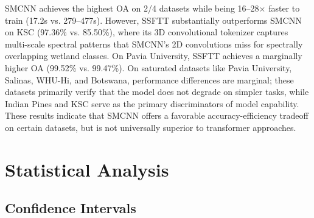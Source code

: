 \documentclass[conference]{IEEEtran}
\begin{document}
{\begin{table}[!t]
\caption{SMCNN vs. Transformer Baselines (OA \%)}
\label{tab:transformer}
\centering
{}
\end{table}

SMCNN achieves the highest OA on 2/4 datasets while being 16--28$\times$ faster to train (17.2s vs. 279--477s). However, SSFTT substantially outperforms SMCNN on KSC (97.36\% vs. 85.50\%), where its 3D convolutional tokenizer captures multi-scale spectral patterns that SMCNN's 2D convolutions miss for spectrally overlapping wetland classes. On Pavia University, SSFTT achieves a marginally higher OA (99.52\% vs. 99.47\%). On saturated datasets like Pavia University, Salinas, WHU-Hi, and Botswana, performance differences are marginal; these datasets primarily verify that the model does not degrade on simpler tasks, while Indian Pines and KSC serve as the primary discriminators of model capability. These results indicate that SMCNN offers a favorable accuracy-efficiency tradeoff on certain datasets, but is not universally superior to transformer approaches.

\section{Statistical Analysis}
\label{sec:stats}

\subsection{Confidence Intervals}

}
\end{document}
